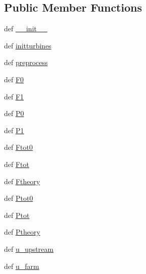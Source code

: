 \subsection*{Public Member Functions}
\begin{DoxyCompactItemize}
\item 
def \hyperlink{classDropbox_1_1ThreeLayerModel_1_1TLMForcing_1_1WF_ad6b367d13923f3a75aabcabe4ff74d70}{\+\_\+\+\_\+init\+\_\+\+\_\+}
\item 
def \hyperlink{classDropbox_1_1ThreeLayerModel_1_1TLMForcing_1_1WF_a030a8c885db97ab96c2b726f25910241}{initturbines}
\item 
def \hyperlink{classDropbox_1_1ThreeLayerModel_1_1TLMForcing_1_1WF_a67d1c9ab3fba78c790e71c53141c3eb0}{preprocess}
\item 
def \hyperlink{classDropbox_1_1ThreeLayerModel_1_1TLMForcing_1_1WF_ac73e1eeee3a44d50772bd44be02da0ef}{F0}
\item 
def \hyperlink{classDropbox_1_1ThreeLayerModel_1_1TLMForcing_1_1WF_ab683bdaf7d54bcb4237d1b1112339d26}{F1}
\item 
def \hyperlink{classDropbox_1_1ThreeLayerModel_1_1TLMForcing_1_1WF_acd7f11b81e2dc684c7302346d0d2a504}{P0}
\item 
def \hyperlink{classDropbox_1_1ThreeLayerModel_1_1TLMForcing_1_1WF_a1c9fa0251bfdf7e2f248efd2af04975c}{P1}
\item 
def \hyperlink{classDropbox_1_1ThreeLayerModel_1_1TLMForcing_1_1WF_ad20e4e2d7075c4431c200b273e8f7f1f}{Ftot0}
\item 
def \hyperlink{classDropbox_1_1ThreeLayerModel_1_1TLMForcing_1_1WF_a615c3a97ed4f7aa6130681297f953c8d}{Ftot}
\item 
def \hyperlink{classDropbox_1_1ThreeLayerModel_1_1TLMForcing_1_1WF_a36bf13a2a19398194dbca95ce929d586}{Ftheory}
\item 
def \hyperlink{classDropbox_1_1ThreeLayerModel_1_1TLMForcing_1_1WF_a40c9d626877a37242119dd0becff207d}{Ptot0}
\item 
def \hyperlink{classDropbox_1_1ThreeLayerModel_1_1TLMForcing_1_1WF_ae845c50dd013b98bf271277ba13d1f17}{Ptot}
\item 
def \hyperlink{classDropbox_1_1ThreeLayerModel_1_1TLMForcing_1_1WF_ae64395d7e0c73f96cc2a3819551b91e1}{Ptheory}
\item 
def \hyperlink{classDropbox_1_1ThreeLayerModel_1_1TLMForcing_1_1WF_a4ba2d43ff7a0837f653978f860d01791}{u\+\_\+upstream}
\item 
def \hyperlink{classDropbox_1_1ThreeLayerModel_1_1TLMForcing_1_1WF_aa63be2a5d5424e8e788be0fbe7df8eb8}{u\+\_\+farm}

\end{DoxyCompactItemize}
